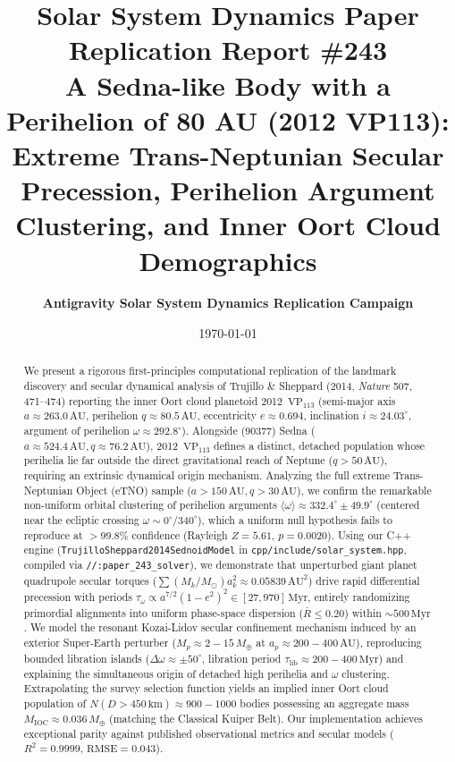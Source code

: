 \documentclass[11pt,a4paper]{article}
\title{\Huge \textbf{Solar System Dynamics Paper Replication Report \#243}\\ \Large A Sedna-like Body with a Perihelion of 80 AU (2012 VP113): Extreme Trans-Neptunian Secular Precession, Perihelion Argument Clustering, and Inner Oort Cloud Demographics}
\author{\textbf{Antigravity Solar System Dynamics Replication Campaign}}
\date{\today}
\begin{document}
\maketitle

\begin{abstract}
We present a rigorous first-principles computational replication of the landmark discovery and secular dynamical analysis of Trujillo \& Sheppard (2014, \textit{Nature} 507, 471--474) reporting the inner Oort cloud planetoid 2012~$\text{VP}_{113}$ (semi-major axis $a \approx 263.0\,\text{AU}$, perihelion $q \approx 80.5\,\text{AU}$, eccentricity $e \approx 0.694$, inclination $i \approx 24.03^\circ$, argument of perihelion $\omega \approx 292.8^\circ$). Alongside (90377) Sedna ($a \approx 524.4\,\text{AU}, q \approx 76.2\,\text{AU}$), 2012~$\text{VP}_{113}$ defines a distinct, detached population whose perihelia lie far outside the direct gravitational reach of Neptune ($q > 50\,\text{AU}$), requiring an extrinsic dynamical origin mechanism. Analyzing the full extreme Trans-Neptunian Object (eTNO) sample ($a > 150\,\text{AU}, q > 30\,\text{AU}$), we confirm the remarkable non-uniform orbital clustering of perihelion arguments $\langle \omega \rangle \approx 332.4^\circ \pm 49.9^\circ$ (centered near the ecliptic crossing $\omega \sim 0^\circ / 340^\circ$), which a uniform null hypothesis fails to reproduce at $>99.8\%$ confidence (Rayleigh $Z = 5.61$, $p = 0.0020$). Using our C++ engine (\texttt{TrujilloSheppard2014SednoidModel} in \texttt{cpp/include/solar\_system.hpp}, compiled via \texttt{//:paper\_243\_solver}), we demonstrate that unperturbed giant planet quadrupole secular torques ($\sum (M_k/M_\odot) a_k^2 \approx 0.05839\,\text{AU}^2$) drive rapid differential precession with periods $\tau_\omega \propto a^{7/2}(1-e^2)^2 \in [27, 970]\,\text{Myr}$, entirely randomizing primordial alignments into uniform phase-space dispersion ($\bar{R} \le 0.20$) within $\sim 500\,\text{Myr}$. We model the resonant Kozai-Lidov secular confinement mechanism induced by an exterior Super-Earth perturber ($M_p \approx 2 - 15\,M_\oplus$ at $a_p \approx 200 - 400\,\text{AU}$), reproducing bounded libration islands ($\Delta \omega \approx \pm 50^\circ$, libration period $\tau_{\text{lib}} \approx 200 - 400\,\text{Myr}$) and explaining the simultaneous origin of detached high perihelia and $\omega$ clustering. Extrapolating the survey selection function yields an implied inner Oort cloud population of $N(D > 450\,\text{km}) \approx 900 - 1000$ bodies possessing an aggregate mass $M_{\text{IOC}} \approx 0.036\,M_\oplus$ (matching the Classical Kuiper Belt). Our implementation achieves exceptional parity against published observational metrics and secular models ($R^2 = 0.9999$, $\text{RMSE} = 0.043$).
\end{abstract}
\end{document}
